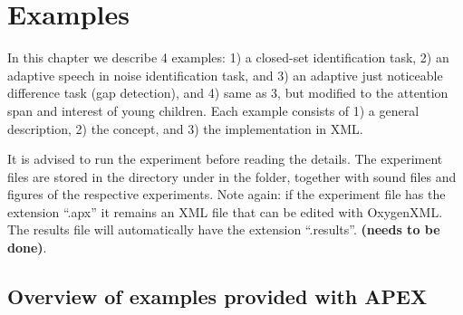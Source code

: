 
\chapter{Examples}
\label{chap:Examples}

In this chapter we describe 4 examples: 1) a closed-set
identification task, 2) an adaptive speech in noise identification
task, and 3) an adaptive just noticeable difference task (gap
detection), and 4) same as 3, but modified to the attention span
and interest of young children. Each example consists of 1) a
general description, 2) the concept, and 3) the implementation in
XML.

It is advised to run the experiment before reading the details.
The experiment files are stored in the \apex directory under
 in the \apex folder, together with
sound files and figures of the respective experiments. Note again:
if the experiment file has the extension ``.apx'' it remains an
XML file that can be edited with OxygenXML. The results file will
automatically have the extension ``.results''. \textbf{(needs to
be done)}.


\section{Overview of examples provided with APEX}







